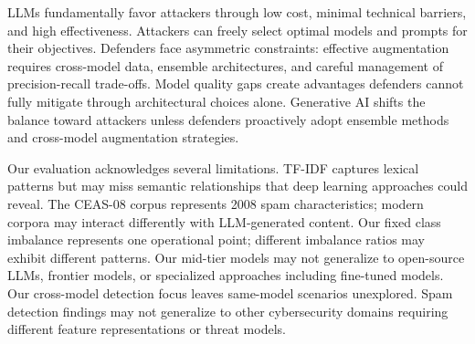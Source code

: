 LLMs fundamentally favor attackers through low cost, minimal technical barriers, and high effectiveness. Attackers can freely select optimal models and prompts for their objectives. Defenders face asymmetric constraints: effective augmentation requires cross-model data, ensemble architectures, and careful management of precision-recall trade-offs. Model quality gaps create advantages defenders cannot fully mitigate through architectural choices alone. Generative AI shifts the balance toward attackers unless defenders proactively adopt ensemble methods and cross-model augmentation strategies.

Our evaluation acknowledges several limitations. TF-IDF captures lexical patterns but may miss semantic relationships that deep learning approaches could reveal. The CEAS-08 corpus represents 2008 spam characteristics; modern corpora may interact differently with LLM-generated content. Our fixed class imbalance represents one operational point; different imbalance ratios may exhibit different patterns. Our mid-tier models may not generalize to open-source LLMs, frontier models, or specialized approaches including fine-tuned models. Our cross-model detection focus leaves same-model scenarios unexplored. Spam detection findings may not generalize to other cybersecurity domains requiring different feature representations or threat models.
